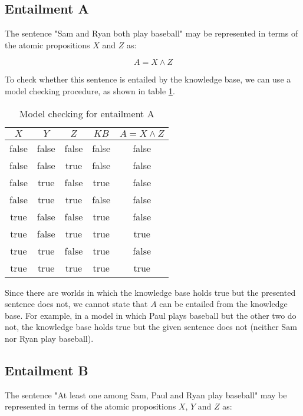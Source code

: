 \documentclass[letterpaper,headings=standardclasses]{scrartcl}
\begin{document}
\subsection{Entailment A}

The sentence "Sam and Ryan both play baseball" may be represented in terms of the atomic propositions $X$ and $Z$ as:

$$ A = X \wedge Z $$

To check whether this sentence is entailed by the knowledge base, we can use a model checking procedure, as shown in table \ref{tt_a}.

\begin{table}[h]
    \centering
    \begin{tabular}{|c|c|c|c|c|}
    \hline
    $X$ & $Y$ & $Z$ & $KB$ & $A = X \wedge Z$ \\ \hline
    false & false & false & false & false \\ \hline
    false & false & true & false & false \\ \hline
    false & true & false & true & false \\ \hline
    false & true & true & false & false \\ \hline
    true & false & false & true & false \\ \hline
    true & false & true & true & true \\ \hline
    true & true & false & true & false \\ \hline
    true & true & true & true & true \\ \hline
    \end{tabular}
    \caption{Model checking for entailment A}
    \label{tt_a}
\end{table}

Since there are worlds in which the knowledge base holds true but the presented sentence does not, we cannot state that $A$ can be entailed from the knowledge base. For example, in a model in which Paul plays baseball but the other two do not, the knowledge base holds true but the given sentence does not (neither Sam nor Ryan play baseball).

\subsection{Entailment B}

The sentence "At least one among Sam, Paul and Ryan play baseball" may be represented in terms of the atomic propositions $X$, $Y$ and $Z$ as:
\end{document}
